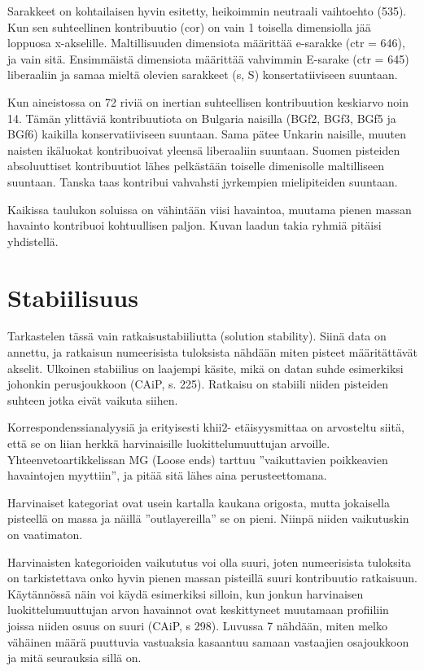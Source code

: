 \documentclass[
  finnish,
]{book}
\begin{document}
Sarakkeet on kohtailaisen hyvin esitetty, heikoimmin neutraali vaihtoehto (535).
Kun sen suhteellinen kontribuutio (cor) on vain 1 toisella dimensiolla jää
loppuosa x-akselille. Maltillisuuden dimensiota määrittää e-sarakke (ctr = 646),
ja vain sitä. Ensimmäistä dimensiota määrittää vahvimmin E-sarake (ctr = 645)
liberaaliin ja samaa mieltä olevien sarakkeet (s, S) konsertatiiviseen suuntaan.

Kun aineistossa on 72 riviä on inertian suhteellisen kontribuution keskiarvo
noin 14. Tämän ylittäviä kontribuutiota on Bulgaria naisilla (BGf2, BGf3, BGf5
ja BGf6) kaikilla konservatiiviseen suuntaan. Sama pätee Unkarin naisille, muuten
naisten ikäluokat kontribuoivat yleensä liberaaliin suuntaan. Suomen pisteiden
absoluuttiset kontribuutiot lähes pelkästään toiselle dimenisolle maltilliseen
suuntaan. Tanska taas kontribui vahvahsti jyrkempien mielipiteiden suuntaan.

Kaikissa taulukon soluissa on vähintään viisi havaintoa, muutama pienen massan
havainto kontribuoi kohtuullisen paljon. Kuvan laadun takia ryhmiä pitäisi
yhdistellä.

\hypertarget{stabiilisuus}{%
\section{Stabiilisuus}\label{stabiilisuus}}

Tarkastelen tässä vain ratkaisustabiiliutta (solution stability). Siinä data on
annettu, ja ratkaisun numeerisista tuloksista nähdään miten pisteet määritättävät
akselit. Ulkoinen stabiilius on laajempi käsite, mikä on datan suhde esimerkiksi
johonkin perusjoukkoon (CAiP, s. 225). Ratkaisu on stabiili niiden pisteiden
suhteen jotka eivät vaikuta siihen.

Korrespondenssianalyysiä ja erityisesti khii2- etäisyysmittaa on arvosteltu siitä,
että se on liian herkkä harvinaisille luokittelumuuttujan arvoille.
Yhteenvetoartikkelissan MG (Loose ends) tarttuu ''vaikuttavien poikkeavien
havaintojen myyttiin'', ja pitää sitä lähes aina perusteettomana.

Harvinaiset kategoriat ovat usein kartalla kaukana origosta, mutta jokaisella
pisteellä on massa ja näillä ''outlayereilla'' se on pieni. Niinpä niiden
vaikutuskin on vaatimaton.

Harvinaisten kategorioiden vaikututus voi olla suuri, joten numeerisista
tuloksita on tarkistettava onko hyvin pienen massan pisteillä suuri kontribuutio
ratkaisuun. Käytännössä näin voi käydä esimerkiksi silloin, kun jonkun
harvinaisen luokittelumuuttujan arvon havainnot ovat keskittyneet muutamaan
profiiliin joissa niiden osuus on suuri (CAiP, s 298). Luvussa 7 nähdään, miten
melko vähäinen määrä puuttuvia vastuaksia kasaantuu samaan vastaajien osajoukkoon
ja mitä seurauksia sillä on.
\end{document}
